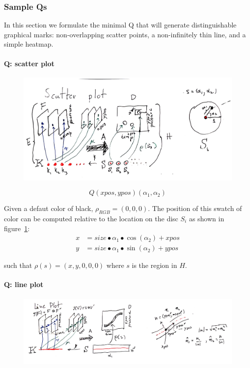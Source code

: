 \documentclass[../main.tex]{subfiles}
\begin{document}
\subsubsection{Sample Qs}
In this section we formulate the minimal Q that will generate distinguishable graphical marks: non-overlapping scatter points, a non-infinitely thin line, and a simple heatmap. 

\paragraph{Q: scatter plot}
\begin{figure}[h!]
    \includegraphics[width=\textwidth]{figures/math/scatter.png}
    \label{fig:artist_scatter}
\end{figure}

\begin{equation}
Q(xpos, ypos)(\alpha_{1}, \alpha_{2}) 
\end{equation}

Given a defaut color of black, $\rho_{RGB} = (0,0,0)$. The position of this swatch of color can be computed relative to the location on the disc $S_{i}$ as shown in figure~\ref{fig:artist_scatter}:
\begin{align}
x &= size\bullet \alpha_1 \bullet \cos(\alpha_2) + xpos\\
y &= size\bullet \alpha_1 \bullet \sin(\alpha_2) + ypos
\end{align}

such that $\rho(s) = (x, y, 0, 0, 0)$ where $s$ is the region in $H$. 

\paragraph{Q: line plot}
\begin{figure}[h!]
    \includegraphics[width=\textwidth]{figures/math/line.png}
    \label{fig:artist_line}
\end{figure}
\end{document}
